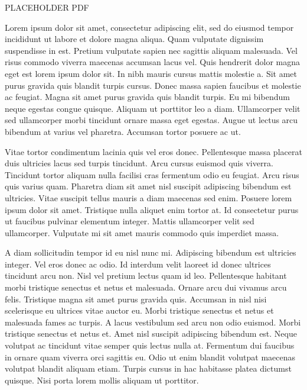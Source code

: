 \documentclass[12pt]{article}
\begin{document}
{
  \large

  PLACEHOLDER PDF
  }

  \pagebreak{}

  Lorem ipsum dolor sit amet, consectetur adipiscing elit, sed do eiusmod tempor incididunt ut labore et dolore magna aliqua. Quam vulputate dignissim suspendisse in est. Pretium vulputate sapien nec sagittis aliquam malesuada. Vel risus commodo viverra maecenas accumsan lacus vel. Quis hendrerit dolor magna eget est lorem ipsum dolor sit. In nibh mauris cursus mattis molestie a. Sit amet purus gravida quis blandit turpis cursus. Donec massa sapien faucibus et molestie ac feugiat. Magna sit amet purus gravida quis blandit turpis. Eu mi bibendum neque egestas congue quisque. Aliquam ut porttitor leo a diam. Ullamcorper velit sed ullamcorper morbi tincidunt ornare massa eget egestas. Augue ut lectus arcu bibendum at varius vel pharetra. Accumsan tortor posuere ac ut.

Vitae tortor condimentum lacinia quis vel eros donec. Pellentesque massa placerat duis ultricies lacus sed turpis tincidunt. Arcu cursus euismod quis viverra. Tincidunt tortor aliquam nulla facilisi cras fermentum odio eu feugiat. Arcu risus quis varius quam. Pharetra diam sit amet nisl suscipit adipiscing bibendum est ultricies. Vitae suscipit tellus mauris a diam maecenas sed enim. Posuere lorem ipsum dolor sit amet. Tristique nulla aliquet enim tortor at. Id consectetur purus ut faucibus pulvinar elementum integer. Mattis ullamcorper velit sed ullamcorper. Vulputate mi sit amet mauris commodo quis imperdiet massa.

A diam sollicitudin tempor id eu nisl nunc mi. Adipiscing bibendum est ultricies integer. Vel eros donec ac odio. Id interdum velit laoreet id donec ultrices tincidunt arcu non. Nisl vel pretium lectus quam id leo. Pellentesque habitant morbi tristique senectus et netus et malesuada. Ornare arcu dui vivamus arcu felis. Tristique magna sit amet purus gravida quis. Accumsan in nisl nisi scelerisque eu ultrices vitae auctor eu. Morbi tristique senectus et netus et malesuada fames ac turpis. A lacus vestibulum sed arcu non odio euismod. Morbi tristique senectus et netus et. Amet nisl suscipit adipiscing bibendum est. Neque volutpat ac tincidunt vitae semper quis lectus nulla at. Fermentum dui faucibus in ornare quam viverra orci sagittis eu. Odio ut enim blandit volutpat maecenas volutpat blandit aliquam etiam. Turpis cursus in hac habitasse platea dictumst quisque. Nisi porta lorem mollis aliquam ut porttitor.
\end{document}
